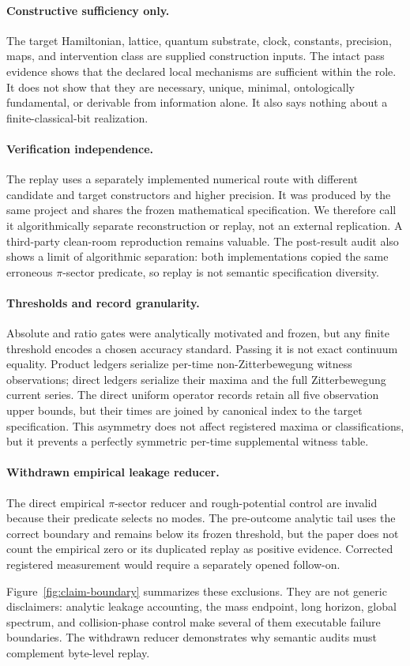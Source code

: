 \paragraph{Constructive sufficiency only.}
The target Hamiltonian, lattice, quantum substrate, clock, constants,
precision, maps, and intervention class are supplied construction inputs.
The intact pass evidence shows that the declared local mechanisms are
sufficient within the role.
It does not show that they are necessary, unique, minimal, ontologically
fundamental, or derivable from information alone.  It also says nothing about
a finite-classical-bit realization.

\paragraph{Verification independence.}
The replay uses a separately implemented numerical route with different
candidate and target constructors and higher precision.  It was produced by
the same project and shares the frozen mathematical specification.  We
therefore call it algorithmically separate reconstruction or replay, not an
external replication.  A third-party clean-room reproduction remains
valuable.  The post-result audit also shows a limit of algorithmic separation:
both implementations copied the same erroneous $\pi$-sector predicate, so
replay is not semantic specification diversity.

\paragraph{Thresholds and record granularity.}
Absolute and ratio gates were analytically motivated and frozen, but any
finite threshold encodes a chosen accuracy standard.  Passing it is not exact
continuum equality.  Product ledgers serialize per-time non-Zitterbewegung
witness observations; direct ledgers serialize their maxima and the full
Zitterbewegung current series.  The direct uniform operator records retain all
five observation upper bounds, but their times are joined by canonical index
to the target specification.  This asymmetry does not affect registered
maxima or classifications, but it prevents a perfectly symmetric
per-time supplemental witness table.

\paragraph{Withdrawn empirical leakage reducer.}
The direct empirical $\pi$-sector reducer and rough-potential control are
invalid because their predicate selects no modes.  The pre-outcome analytic
tail uses the correct boundary and remains below its frozen threshold, but the
paper does not count the empirical zero or its duplicated replay as positive
evidence.  Corrected registered measurement would require a separately opened
follow-on.

Figure~\ref{fig:claim-boundary} summarizes these exclusions.  They are not generic
disclaimers: analytic leakage accounting, the mass endpoint, long horizon,
global spectrum, and collision-phase control make several of them executable
failure boundaries.  The withdrawn reducer demonstrates why semantic audits
must complement byte-level replay.
